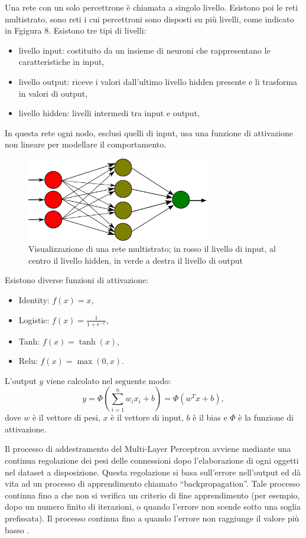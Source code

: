 \documentclass[12pt,italian]{report}
\begin{document}
Una rete con un solo percettrone è chiamata a singolo livello. Esistono poi le reti multistrato, sono reti i cui percettroni sono disposti su più livelli, come indicato in Fgigura 8. Esistono tre tipi di livelli: 
\begin{itemize}
	\item livello input: costituito da un insieme di neuroni che rappresentano le caratteristiche in input,
	\item livello output: riceve i valori dall'ultimo livello hidden presente e li trasforma in valori di output, 
	\item livello hidden: livelli intermedi tra input e output, 
\end{itemize}


In questa rete ogni nodo, esclusi quelli di input, usa una funzione di attivazione non lineare per modellare il comportamento.

\begin{figure}[h]
	\centering
	\includegraphics[width = 80mm]{immagini/Multilayer-Perceptron}
	\caption{Visualizzazione di una rete multistrato; in rosso il livello di input, al centro il livello hidden, in verde a destra il livello di output}
\end{figure}
Esistono diverse funzioni di attivazione:
\begin{itemize}
	\item Identity: $f(x) = x$,
	\item Logistic: $f(x) = \frac{1}{1 + e^{-x}}$,
	\item Tanh: $f(x) = \tanh(x)$,
	\item Relu: $f(x) = \max(0, x)$.
\end{itemize}
L'output $y$ viene calcolato nel seguente modo: 
\begin{equation}
y = \Phi \left ( \sum_{i=1}^{n}w_ix_i + b \right ) = \Phi (w^{T}x + b),
\end{equation}
dove $w$ è il vettore di pesi, $x$ è il vettore di input, $b$ è il bias e $\Phi$ è la funzione di attivazione.

Il processo di addestramento del Multi-Layer Perceptron avviene mediante una continua regolazione dei pesi delle connessioni dopo l'elaborazione di ogni oggetti nel dataset a disposizione. Questa regolazione si basa sull'errore nell'output ed dà vita ad un processo di apprendimento chiamato ``backpropagation''. Tale processo continua fino a che non si verifica un criterio di fine apprendimento (per esempio, dopo un numero finito di iterazioni, o quando l'errore non scende sotto una soglia prefissata).
Il processo continua fino a quando l'errore non raggiunge il valore più basso \cite{multilayerPerceptron}.
\end{document}
